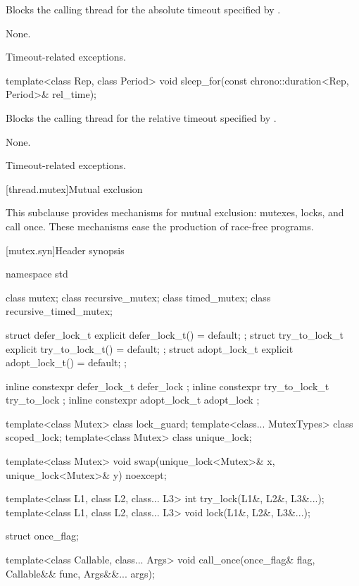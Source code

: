 \begin{itemdescr}
\pnum
\effects Blocks the calling thread for the absolute timeout specified
by .

\pnum
\sync None.

\pnum
\throws Timeout-related exceptions.
\end{itemdescr}

%
\begin{itemdecl}
template<class Rep, class Period>
  void sleep_for(const chrono::duration<Rep, Period>& rel_time);
\end{itemdecl}

\begin{itemdescr}
\pnum
\effects Blocks the calling thread for the relative timeout specified
by .

\pnum
\sync None.

\pnum
\throws Timeout-related exceptions.
\end{itemdescr}

[thread.mutex]{Mutual exclusion}

\pnum
This subclause provides mechanisms for mutual exclusion: mutexes, locks, and call
once. These mechanisms ease the production of race-free
programs.

[mutex.syn]{Header  synopsis}
%

\begin{codeblock}
namespace std {
  class mutex;
  class recursive_mutex;
  class timed_mutex;
  class recursive_timed_mutex;

  struct defer_lock_t { explicit defer_lock_t() = default; };
  struct try_to_lock_t { explicit try_to_lock_t() = default; };
  struct adopt_lock_t { explicit adopt_lock_t() = default; };

  inline constexpr defer_lock_t  defer_lock { };
  inline constexpr try_to_lock_t try_to_lock { };
  inline constexpr adopt_lock_t  adopt_lock { };

  template<class Mutex> class lock_guard;
  template<class... MutexTypes> class scoped_lock;
  template<class Mutex> class unique_lock;

  template<class Mutex>
    void swap(unique_lock<Mutex>& x, unique_lock<Mutex>& y) noexcept;

  template<class L1, class L2, class... L3> int try_lock(L1&, L2&, L3&...);
  template<class L1, class L2, class... L3> void lock(L1&, L2&, L3&...);

  struct once_flag;

  template<class Callable, class... Args>
    void call_once(once_flag& flag, Callable&& func, Args&&... args);
}
\end{codeblock}


